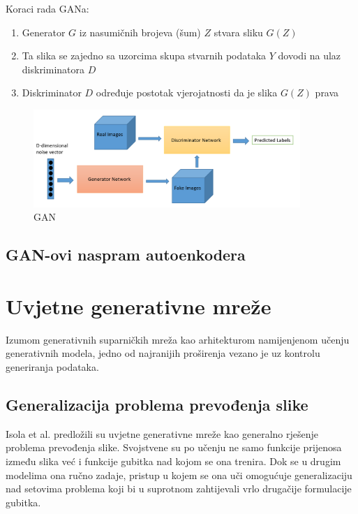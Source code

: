 \documentclass[lmodern, utf8, seminar]{fer}
\begin{document}
Koraci rada GANa:
\begin{enumerate} 
\item Generator $G$ iz nasumičnih brojeva (šum) $Z$ stvara sliku $G(Z)$
\item Ta slika se zajedno sa uzorcima skupa stvarnih podataka $Y$ dovodi na ulaz diskriminatora $D$
\item Diskriminator $D$ određuje postotak vjerojatnosti da je slika $G(Z)$ prava
\end{enumerate}

\begin{figure}[H]
    \centering
    \includegraphics[width=0.9\textwidth]{gan_schema}
    \caption{GAN \cite{goodfellow2016nips}}
    \label{fig:convolution}
\end{figure}

\section{GAN-ovi naspram autoenkodera}


\chapter{Uvjetne generativne mreže}
Izumom generativnih suparničkih mreža kao arhitekturom namijenjenom učenju generativnih modela, jedno od najranijih proširenja vezano je uz kontrolu generiranja podataka. 

\section{Generalizacija problema prevođenja slike}
Isola et al. \cite{isola2017image} predložili su uvjetne generativne mreže kao generalno rješenje problema prevođenja slike. Svojstvene su po učenju ne samo funkcije prijenosa između slika već i funkcije gubitka nad kojom se ona trenira.
Dok se u drugim modelima ona ručno zadaje, pristup u kojem se ona uči omogućuje generalizaciju nad setovima problema koji bi u suprotnom zahtijevali vrlo drugačije formulacije gubitka.
\newline
\end{document}
